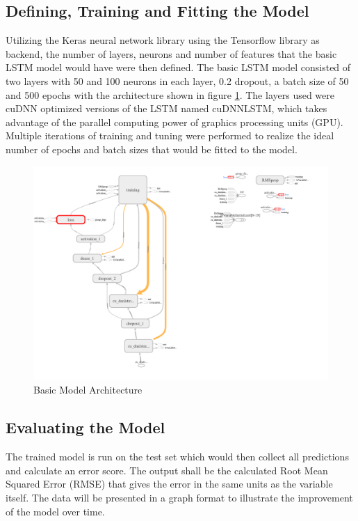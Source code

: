 ﻿\documentclass[10pt,11pt,12pt,oneside]{book}
\begin{document}
    \subsection{Defining, Training and Fitting the Model}
    Utilizing the Keras neural network library \cite{chollet2015keras} using the Tensorflow library \cite{tensorflow2015-whitepaper} as backend, the number of layers, neurons and number of features that the basic LSTM model would have were then defined. The basic LSTM model consisted of two layers with 50 and 100 neurons in each layer, 0.2 dropout, a batch size of 50 and 500 epochs with the architecture shown in figure \ref{fig:basic_arch}. The layers used were cuDNN\cite{Chetlur2014cuDNNEP} optimized versions of the LSTM named cuDNNLSTM, which takes advantage of the parallel computing power of graphics processing units (GPU). Multiple iterations of training and tuning were performed to realize the ideal number of epochs and batch sizes that would be fitted to the model.
\begin{figure}[H]
\includegraphics[width=\linewidth]{basic_architecture.png}
\caption{Basic Model Architecture}
\label{fig:basic_arch}
\end{figure}
    \subsection{Evaluating the Model}
    The trained model is run on the test set which would then collect all predictions and calculate an error score. The output shall be the calculated Root Mean Squared Error (RMSE) that gives the error in the same units as the variable itself. The data will be presented in a graph format to illustrate the improvement of the model over time.
\end{document}
